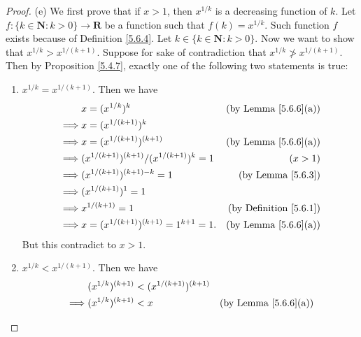 \begin{proof}{(e)}
    We first prove that if \(x > 1\), then \(x^{1 / k}\) is a decreasing function of \(k\).
    Let \(f : \{k \in \mathbf{N} : k > 0\} \to \mathbf{R}\) be a function such that \(f(k) = x^{1 / k}\).
    Such function \(f\) exists because of Definition \ref{5.6.4}.
    Let \(k \in \{k \in \mathbf{N} : k > 0\}\).
    Now we want to show that \(x^{1 / k} > x^{1 / (k + 1)}\).
    Suppose for sake of contradiction that \(x^{1 / k} \not> x^{1 / (k + 1)}\).
    Then by Proposition \ref{5.4.7}, exactly one of the following two statements is true:
    \begin{enumerate}[label=(\Roman*)]
        \item \(x^{1 / k} = x^{1 / (k + 1)}\).
              Then we have
              \begin{align*}
                           & x = (x^{1 / k})^k                                     & \text{(by Lemma \ref{5.6.6}(a))}   \\
                  \implies & x = (x^{1 / (k + 1)})^k                                                                    \\
                  \implies & x = (x^{1 / (k + 1)})^{(k + 1)}                       & \text{(by Lemma \ref{5.6.6}(a))}   \\
                  \implies & (x^{1 / (k + 1)})^{(k + 1)} / (x^{1 / (k + 1)})^k = 1 & (x > 1)                            \\
                  \implies & (x^{1 / (k + 1)})^{(k + 1) - k} = 1                   & \text{(by Lemma \ref{5.6.3})}      \\
                  \implies & (x^{1 / (k + 1)})^1 = 1                                                                    \\
                  \implies & x^{1 / (k + 1)} = 1                                   & \text{(by Definition \ref{5.6.1})} \\
                  \implies & x = (x^{1 / (k + 1)})^{(k + 1)} = 1^{k + 1} = 1.      & \text{(by Lemma \ref{5.6.6}(a))}
              \end{align*}
              But this contradict to \(x > 1\).
        \item \(x^{1 / k} < x^{1 / (k + 1)}\).
              Then we have
              \begin{align*}
                           & (x^{1 / k})^{(k + 1)} < (x^{1 / (k + 1)})^{(k + 1)}                                       \\
                  \implies & (x^{1 / k})^{(k + 1)} < x                           & \text{(by Lemma \ref{5.6.6}(a))}    \\

\end{align*}
\end{enumerate}
\end{proof}
